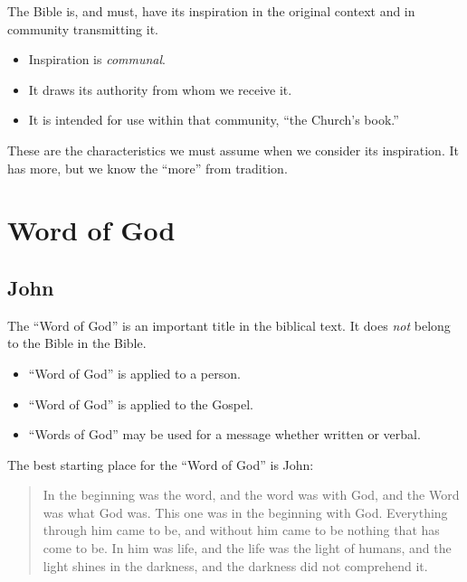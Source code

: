 \documentclass{beamer}
\begin{document}
\begin{frame}
  The Bible is, and must, have its inspiration in the original context and in community transmitting it.\pause
  \begin{itemize}
	\item Inspiration is \emph{communal}.\pause
	\item It draws its authority from whom we receive it.\pause
	\item It is intended for use within that community, ``the Church's book.''
  \end{itemize}
\end{frame}

\begin{frame}
  These are the characteristics we must assume when we consider its inspiration.
  It has more, but we know the ``more'' from tradition.
\end{frame}

\section{Word of God}

\subsection{John}

\begin{frame}
  The ``Word of God'' is an important title in the biblical text.
  It does \emph{not} belong to the Bible in the Bible.\pause
  \begin{itemize}
	\item ``Word of God'' is applied to a person.\pause
	\item ``Word of God'' is applied to the Gospel.\pause
	\item ``Words of God'' may be used for a message whether written or verbal.
  \end{itemize}
\end{frame}

\begin{frame}
  The best starting place for the ``Word of God'' is John:
  \begin{quote}
	In the beginning was the word, and the word was with God, and the Word was what God was.
	This one was in the beginning with God.
	Everything through him came to be, and without him came to be nothing that has come to be.
	In him was life, and the life was the light of humans,
	and the light shines in the darkness, and the darkness did not comprehend it.
  \end{quote}
\end{frame}
\end{document}
